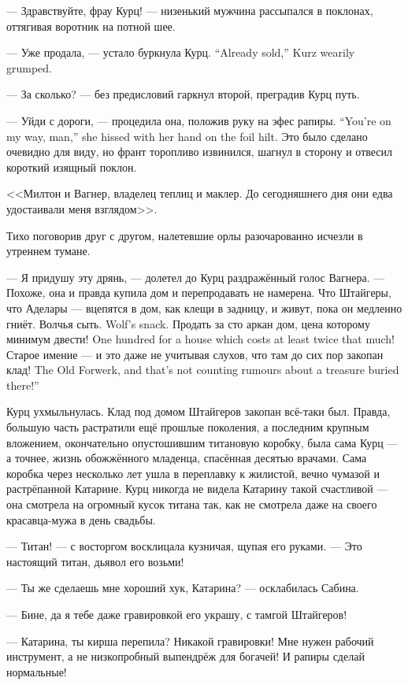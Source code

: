 --- Здравствуйте, фрау Курц! --- низенький мужчина рассыпался в поклонах, оттягивая воротник на потной шее.

{--- Уже продала, --- устало буркнула Курц.}
{``Already sold,'' Kurz wearily grumped.}

--- За сколько? --- без предисловий гаркнул второй, преградив Курц путь.

{--- Уйди с дороги, --- процедила она, положив руку на эфес рапиры.}
{``You're on my way, man,'' she hissed with her hand on the foil hilt.}
Это было сделано очевидно для виду, но франт торопливо извинился, шагнул в сторону и отвесил короткий изящный поклон.

<<Милтон и Вагнер, владелец теплиц и маклер.
До сегодняшнего дня они едва удостаивали меня взглядом>>.

Тихо поговорив друг с другом, налетевшие орлы разочарованно исчезли в утреннем тумане.

--- Я придушу эту дрянь, --- долетел до Курц раздражённый голос Вагнера.
--- Похоже, она и правда купила дом и перепродавать не намерена.
Что Штайгеры, что Аделары --- вцепятся в дом, как клещи в задницу, и живут, пока он медленно гниёт.
{Волчья сыть.}
{Wolf's snack.}
{Продать за сто аркан дом, цена которому минимум двести!}
{One hundred for a house which costs at least twice that much!}
{Старое имение --- и это даже не учитывая слухов, что там до сих пор закопан клад!}
{The Old Forwerk, and that's not counting rumours about a treasure buried there!''}

Курц ухмыльнулась.
Клад под домом Штайгеров закопан всё-таки был.
Правда, большую часть растратили ещё прошлые поколения, а последним крупным вложением, окончательно опустошившим титановую коробку, была сама Курц --- а точнее, жизнь обожжённого младенца, спасённая десятью врачами.
Сама коробка через несколько лет ушла в переплавку к жилистой, вечно чумазой и растрёпанной Катарине.
Курц никогда не видела Катарину такой счастливой --- она смотрела на огромный кусок титана так, как не смотрела даже на своего красавца-мужа в день свадьбы.

--- Титан! --- с восторгом восклицала кузничая, щупая его руками.
--- Это настоящий титан, дьявол его возьми!

--- Ты же сделаешь мне хороший хук, Катарина? --- осклабилась Сабина.

--- Бине, да я тебе даже гравировкой его украшу, с тамгой Штайгеров!

--- Катарина, ты кирша перепила?
Никакой гравировки!
Мне нужен рабочий инструмент, а не низкопробный выпендрёж для богачей!
И рапиры сделай нормальные!

